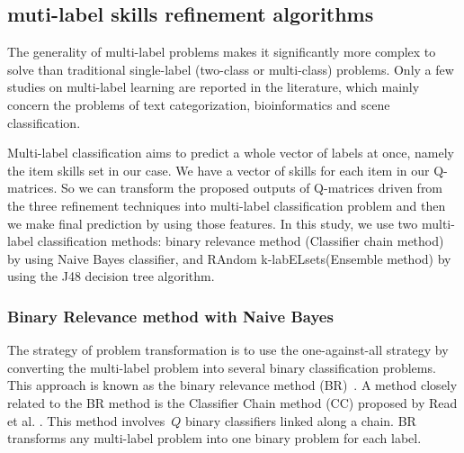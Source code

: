 \documentclass[11pt]{article}
\begin{document}



\subsection{muti-label skills refinement algorithms}

The generality of multi-label problems makes it significantly more complex to solve than traditional single-label (two-class or multi-class) problems. Only a few studies on multi-label learning are reported in the literature, which mainly concern the problems of text categorization, bioinformatics and scene classification. 

Multi-label classification aims to predict a whole vector of labels at once, namely the item skills set in our case. We have a vector of skills for each item in our Q-matrices. So we can transform the proposed outputs of Q-matrices driven from the three refinement techniques into multi-label classification problem and then we make final prediction by using those features. In this study, we use two multi-label classification methods: binary relevance method (Classifier chain method)~\cite{read2011classifier} by using Naive Bayes classifier, and RAndom k-labELsets(Ensemble method) \cite{Tsoumakas2011random} by using the J48 decision tree algorithm.


\subsubsection{Binary Relevance method with Naive Bayes}
The strategy of problem transformation is to use the one-against-all strategy by converting the multi-label problem into several binary classification problems. This approach is known as the binary relevance method (BR)~\cite{read2011classifier}. A method closely related to the BR method is the Classifier Chain method (CC) proposed by Read et al. \cite{read2011classifier}. This method involves~$Q$ binary classifiers linked along a chain. BR transforms any multi-label problem into one binary problem for each label. 
\end{document}
